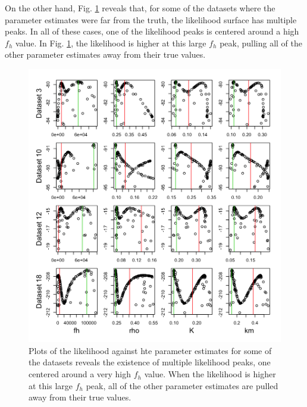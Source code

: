 \documentclass[12pt,reqno,final,pdftex]{amsart}\usepackage[]{graphicx}\usepackage[]{color}
\newenvironment{knitrout}{}{} %
\theoremstyle{plain}
\numberwithin{equation}{part}
\begin{document}
On the other hand, Fig. \ref{fig:lik-against-ests-2} reveals that, for some of the datasets where the parameter estimates were far from the truth, the likelihood surface has multiple peaks.
In all of these cases, one of the likelihood peaks is centered around a high $f_h$ value.
In Fig. \ref{fig:lik-against-ests-2}, the likelihood is higher at this large $f_h$ peak, pulling all of the other parameter estimates away from their true values.

\begin{knitrout}\scriptsize
{}\color{fgcolor}\begin{figure}

\includegraphics[width=\linewidth]{figure/lik-against-ests-2-1} \hfill{}

\caption[Plots of the likelihood against hte parameter estimates for some of the datasets reveals the existence of multiple likelihood peaks, one centered around a very high ]{Plots of the likelihood against hte parameter estimates for some of the datasets reveals the existence of multiple likelihood peaks, one centered around a very high $f_h$ value. When the likelihood is higher at this large $f_h$ peak, all of the other parameter estimates are pulled away from their true values.}\label{fig:lik-against-ests-2}
\end{figure}


\end{knitrout}
\end{document}

